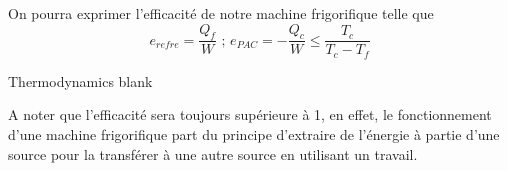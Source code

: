 \begin{proposition}
On pourra exprimer l'efficacité de notre machine frigorifique telle que
\begin{equation}
e_{refre}=\frac{Q_f}{W}\textrm{  ;  } e_{PAC}=-\frac{Q_c}{W}\leq\frac{T_c}{T_c-T_f}
\end{equation}
\end{proposition}

{\color{white}Thermodynamics blank}\\

\begin{remark}

A noter que l'efficacité sera toujours supérieure à 1, en effet, le fonctionnement d'une machine frigorifique part du principe d'extraire de l'énergie à partie d'une source pour la transférer à une autre source en utilisant un travail. 

\end{remark}
